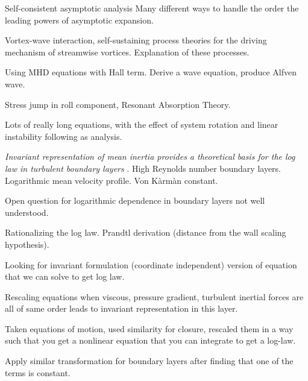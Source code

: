 \begin{description}
{\begin{description}
Self-consistent asymptotic analysis
Many different ways to handle the order the leading powers of asymptotic expansion.

Vortex-wave interaction, self-sustaining process theories for the driving mechanism
of streamwise vortices. Explanation of these processes.

Using MHD equations with Hall term.
Derive a wave equation, produce Alfven wave.

Stress jump in roll component, Resonant Absorption Theory.

Lots of really long equations, with the effect of system rotation and linear instability following as analysis.
\item[J. Klewicki Talk]
\textit{Invariant representation of mean inertia provides a theoretical basis for the log law in turbulent boundary layers}
.
High Reynolds number boundary layers. Logarithmic mean velocity profile. Von K\`arm\`an constant.

Open question for logarithmic dependence in boundary layers not
well understood.

Rationalizing the log law. Prandtl
derivation (distance from the wall scaling hypothesis).

Looking for invariant formulation (coordinate independent) version of equation that we can solve to get log law.

Rescaling equations when viscous, pressure gradient, turbulent inertial forces are all of same order leads to invariant representation in this layer.

Taken equations of motion, used similarity for closure, rescaled them in a way such that you get a nonlinear equation that you can integrate to get a log-law.

Apply similar transformation for boundary layers after finding that one of the terms is constant.
\end{description}
}

\end{description}
